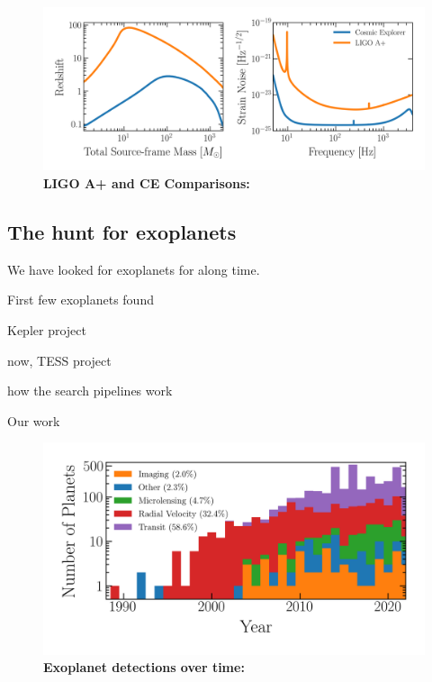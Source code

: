 \begin{figure}
\begin{center}
  \centerline{\includegraphics[width=1.\linewidth]{src/figures/ligo_vs_ce.png}}
  \caption{\textbf{LIGO A+ and CE Comparisons:}  }
  \label{fig:ligo_vs_ce}
\end{center}
\end{figure}




\subsection{The hunt for exoplanets}

We have looked for exoplanets for along time. 

First few exoplanets found 

Kepler project

now, TESS project

how the search pipelines work

Our work 


\begin{figure}
\begin{center}
  \centerline{\includegraphics[width=1.\linewidth]{src/figures/confirmed_planets_vs_time.png}}
  \caption{\textbf{Exoplanet detections over time:}  }
  \label{fig:exo_detections_over_time}
\end{center}
\end{figure}


